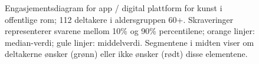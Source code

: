 \begin{figure}
\fi

\caption{%
Engasjementsdiagram for app / digital plattform for
kunst i offentlige rom;
112 deltakere i aldersgruppen 60+. 
Skraveringer representerer svarene mellom 10\% og  90\%
percentilene; orange linjer: median-verdi; gule linjer: middelverdi.
Segmentene i midten viser om deltakerne {\o}nsker (gr{\o}nn) eller ikke
{\o}nsker (r{\o}dt) disse elementene.
}%
\label{fig:Opinion:112}
\end{figure}
